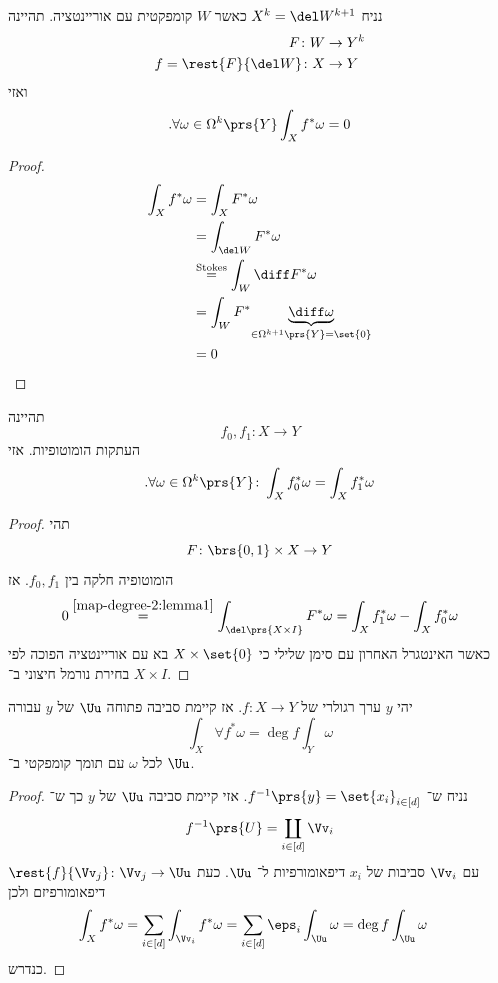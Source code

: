 \documentclass[a4paper,10pt,twoside,openany]{book}
\begin{document}
\begin{lemma}\label{map-degree-2:lemma1}
נניח
$X^k = \del W^{k+1}$
כאשר
$W$
קומפקטית עם אוריינטציה.
תהיינה
\begin{align*}
F \colon W &\to Y^k \\
f = \rest{F}{\del W} \colon X & \to Y
\end{align*}
ואזי
\[\text{.} \forall \omega \in \Omega^k\prs{Y} \int_X f^* \omega = 0\]
\end{lemma}
\begin{proof}
\begin{align*}
\int_X f^* \omega &= \int_X F^* \omega \\&= \int_{\del W} F^* \omega \\&\stackrel{\text{Stokes}}{=} \int_W \diff F^* \omega \\&= \int_W F^* \underset{\in \Omega^{k+1}\prs{Y} = \set{0}}{\underbrace{\diff \omega}} \\&= 0
\end{align*}
\end{proof}

\begin{lemma}\label{map-degree-2:lemma2}
תהיינה
\[f_0, f_1 \colon X \to Y\]
העתקות הומוטופיות. אזי
\begin{align*}
\text{.} \forall \omega \in \Omega^k\prs{Y} \colon \int_X f^*_0 \omega = \int_X f_1^* \omega
\end{align*}
\end{lemma}
\begin{proof}
תהי
\[F \colon \brs{0,1}\times X \to Y\]
הומוטופיה חלקה בין
$f_0, f_1$.
אז
\begin{align*}
0 \stackrel{\ref{map-degree-2:lemma1}}{=} \int_{\del \prs{X \times I}} F^* \omega = \int_X f_1^* \omega - \int_X f_0^* \omega
\end{align*}
כאשר האינטגרל האחרון
עם סימן שלילי כי
$X \times \set{0}$
בא עם אוריינטציה הפוכה לפי בחירת נורמל חיצוני ב־%
$X \times I$.
\end{proof}
\begin{lemma}\label{map-degree-2:lemma3}
יהי
$y$
ערך רגולרי של
$f \colon X \to Y$.
אז קיימת סביבה פתוחה
$\Uu$
של
$y$
עבורה
\[\int_X \forall f^* \omega = \deg f \int_Y \omega\]
לכל
$\omega$
עם תומך קומפקטי ב־%
$\Uu$.
\end{lemma}

\begin{proof}
נניח ש־%
$f^{-1}\prs{y} = \set{x_i}_{i \in [d]}$.
אזי קיימת סביבה
$\Uu$
של
$y$
כך ש־%
\[f^{-1}\prs{U} = \coprod_{i \in [d]} \Vv_i\]
עם
$\Vv_i$
סביבות של
$x_i$
דיפאומורפיות ל־%
$\Uu$.
כעת
$\rest{f}{\Vv_j} \colon \Vv_j \to \Uu$
דיפאומורפיזם ולכן
\begin{align*}
\int_X f^* \omega &= \sum_{i\in [d]} \int_{\Vv_i} f^* \omega = \sum_{i\in[d]} \eps_i \int_{\Uu} \omega = \deg f \int_{\Uu} \omega
\end{align*}
כנדרש.
\end{proof}
\end{document}
